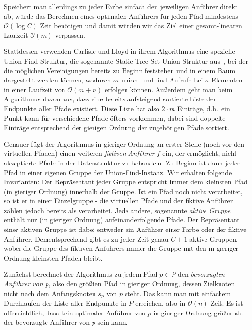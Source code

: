 Speichert man allerdings zu jeder Farbe einfach den jeweiligen Anführer direkt ab, würde das Berechnen eines optimalen
Anführers für jeden Pfad mindestens $\mathcal O(\log C)$ Zeit benötigen und damit würden wir das Ziel einer gesamt-linearen Laufzeit
$\mathcal O(m)$ verpassen.

Stattdessen verwenden Carlisle und Lloyd in ihrem Algorithmus eine spezielle Union-Find-Struktur, die sogenannte
Static-Tree-Set-Union-Struktur aus~\cite{static-tree-set-union}, bei der die möglichen Vereinigungen bereits zu Beginn feststehen und in einem Baum
dargestellt werden können, wodurch $m$ union- und find-Aufrufe bei $n$ Elementen in einer Laufzeit von $\mathcal O(m + n)$ erfolgen können.
Außerdem geht man beim Algorithmus davon aus, dass eine bereits aufsteigend sortierte Liste der Endpunkte aller Pfade existiert.
Diese Liste hat also $2\cdot m$ Einträge, d.h.\ ein Punkt kann für verschiedene Pfade öfters vorkommen, dabei sind doppelte Einträge entsprechend der gierigen
Ordnung der zugehörigen Pfade sortiert.

Genauer fügt der Algorithmus in gieriger Ordnung an erster Stelle (noch vor den virtuellen Pfaden) einen weiteren {\em fiktiven Anführer $f$}
ein, der ermöglicht, nicht-akzeptierte Pfade in der Datenstruktur zu behandeln.
Zu Beginn ist dann jeder Pfad in einer eigenen Gruppe der Union-Find-Instanz.
Wir erhalten folgende Invarianten:
Der Repräsentant jeder Gruppe entspricht immer dem kleinsten Pfad (in gieriger Ordnung) innerhalb der Gruppe.
Ist ein Pfad noch nicht verarbeitet, so ist er in einer Einzelgruppe - die virtuellen Pfade und der fiktive Anführer
zählen jedoch bereits als verarbeitet.
Jede andere, sogenannte {\em aktive Gruppe} enthält nur (in gieriger Ordnung) aufeinanderfolgende Pfade.
Der Repräsentant einer aktiven Gruppe ist dabei entweder ein Anführer einer Farbe oder der fiktive Anführer.
Dementsprechend gibt es zu jeder Zeit genau $C+1$ aktive Gruppen, wobei die Gruppe des fiktiven
Anführers immer die Gruppe mit den in gieriger Ordnung kleinsten Pfaden bleibt.

Zunächst berechnet der Algorithmus zu jedem Pfad $p \in P$ den {\em bevorzugten Anführer von $p$}, also den größten Pfad
in gieriger Ordnung, dessen Zielknoten nicht nach dem Anfangsknoten $s_p$ von $p$ steht.
Das kann man mit einfachem Durchlaufen der Liste aller Endpunkte in $P$ erreichen, also in $\mathcal O(n)$ Zeit.
Es ist offensichtlich, dass kein optimaler Anführer von $p$ in gieriger Ordnung größer als der bevorzugte Anführer von
$p$ sein kann.

